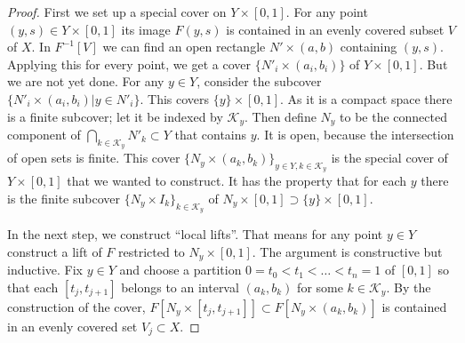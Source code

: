 \begin{proof}
First we set up a special cover on $Y\times[0,1]$.
For any point $(y,s) \in Y \times [0,1]$ its image $F(y,s)$ is contained in an evenly covered subset $V$ of $X$.
In $F^{-1}[V]$ we can find an open rectangle $N' \times (a,b)$ containing $(y,s)$.
Applying this for every point, we get a cover $\{ N'_i \times (a_i,b_i) \}$ of $Y \times [0,1]$.
But we are not yet done.
For any $y \in Y$, consider the subcover $\{ N'_i \times (a_i,b_i) | y \in N'_i \}$.
This covers $\{y\}\times [0,1]$.
As it is a compact space there is a finite subcover; let it be indexed by $\mathcal{K}_y$.
Then define $N_y$ to be the connected component of $\bigcap_{k \in \mathcal{K}_y} N'_k \subset Y$ that contains $y$.
It is open, because the intersection of open sets is finite.
This cover $\{N_y \times (a_k,b_k)\}_{y \in Y, k \in \mathcal{K}_y}$ is the special cover of $Y \times [0,1]$ that we wanted to construct.
It has the property that for each $y$ there is the finite subcover $\{N_y \times I_k\}_{k \in \mathcal{K}_y}$ of $N_y\times [0,1] \supset \{y\} \times [0,1]$.
\begin{center}
\end{center}

In the next step, we construct ``local lifts''.
That means for any point $y \in Y$ construct a lift of $F$ restricted to $N_y\times[0,1]$.
The argument is constructive but inductive.
Fix $y \in Y$ and choose a partition $0 = t_0 < t_1 < \dots < t_n = 1$ of $[0,1]$ so that each $[t_j, t_{j+1}]$ belongs to an interval $(a_k,b_k)$ for some $k \in \mathcal{K}_{y}$.
By the construction of the cover, $F[N_{y} \times [t_j,t_{j+1}]] \subset F[N_y \times (a_k,b_k)]$ is contained in an evenly covered set $V_j \subset X$.


\end{proof}
